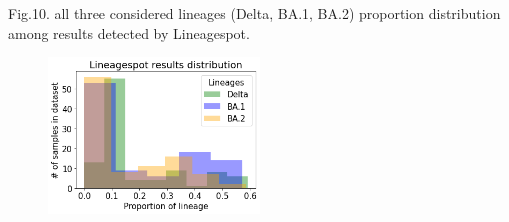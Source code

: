         Fig.10. all three considered lineages (Delta, BA.1, BA.2) proportion distribution among results detected by Lineagespot.
        \begin{figure}[H]
        	\centering
            \includegraphics[width=0.5\textwidth]{figures/further/distr-lineagespot.png}
            \label{fig:further:dist-ls}
        \end{figure}
        
\clearpage

